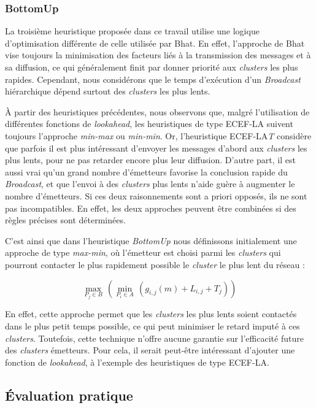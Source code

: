 \subsubsection*{BottomUp}

La troisième heuristique proposée dans ce travail utilise une logique
d'optimisation différente de celle utilisée par Bhat. En effet, l'approche
de Bhat vise toujours la minimisation des facteurs liés à la transmission
des messages et à sa diffusion, ce qui généralement finit par donner
priorité aux  \textit{clusters} les plus rapides. Cependant, nous considérons
que le temps d'exécution d'un \textit{Broadcast} hiérarchique dépend surtout
des  \textit{clusters} les plus lents.

À partir des heuristiques précédentes, nous observons que, malgré
l'utilisation de différentes fonctions de \emph{lookahead}, les heuristiques
de type ECEF-LA suivent toujours l'approche \emph{min-max} ou \emph{min-min}.
Or, l'heuristique ECEF-LA\emph{T} considère que parfois il est plus
intéressant d'envoyer les messages d'abord aux  \textit{clusters} les plus lents,
pour ne pas retarder encore plus leur diffusion. D'autre part, il
est aussi vrai qu'un grand nombre d'émetteurs favorise la conclusion
rapide du \textit{Broadcast}, et que l'envoi à des  \textit{clusters} plus lents n'aide
guère à augmenter le nombre d'émetteurs. Si ces deux raisonnements
sont a priori opposés, ils ne sont pas incompatibles. En effet, les
deux approches peuvent être combinées si des règles précises sont
déterminées.

C'est ainsi que dans l'heuristique \textit{BottomUp} nous définissons initialement
une approche de type \emph{max-min}, où l'émetteur est choisi parmi
les  \textit{clusters} qui pourront contacter le plus rapidement possible le
 \textit{cluster} le plus lent du réseau :

\[
\max_{P_{j}\in B}\,(\min_{P_{i}\in A}\,(g_{i,j}(m)+L_{i,j}+T_{j}))\]


En effet, cette approche permet que les  \textit{clusters} les plus lents soient
contactés dans le plus petit temps possible, ce qui peut minimiser
le retard imputé à ces  \textit{clusters}. Toutefois, cette technique n'offre
aucune garantie sur l'efficacité future des  \textit{clusters} émetteurs. Pour
cela, il serait peut-être intéressant d'ajouter une fonction de \emph{lookahead},
à l'exemple des heuristiques de type ECEF-LA.


\subsection{Évaluation pratique}

